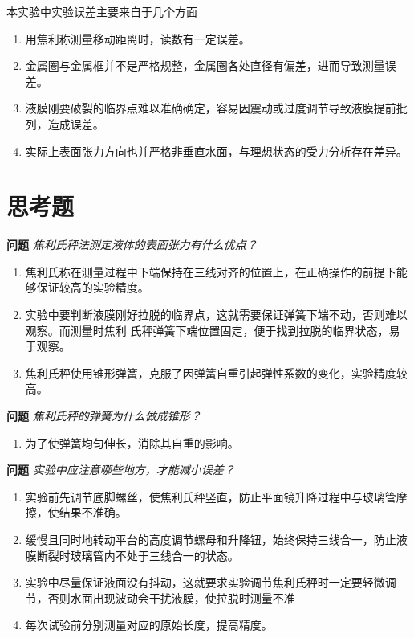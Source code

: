 \documentclass[10pt,a4paper]{article}	%
\begin{document}
	本实验中实验误差主要来自于几个方面

	\begin{enumerate}
		\item 用焦利称测量移动距离时，读数有一定误差。
		\item 金属圈与金属框并不是严格规整，金属圈各处直径有偏差，进而导致测量误差。
		\item 液膜刚要破裂的临界点难以准确确定，容易因震动或过度调节导致液膜提前批列，造成误差。
		\item 实际上表面张力方向也并严格非垂直水面，与理想状态的受力分析存在差异。
	\end{enumerate}

	\section{思考题}

	\noindent\textbf {问题 }\textsl{ 焦利氏秤法测定液体的表面张力有什么优点？}

	\begin{enumerate}
		\item 焦利氏称在测量过程中下端保持在三线对齐的位置上，在正确操作的前提下能够保证较高的实验精度。
		\item 实验中要判断液膜刚好拉脱的临界点，这就需要保证弹簧下端不动，否则难以观察。而测量时焦利
		氏秤弹簧下端位置固定，便于找到拉脱的临界状态，易于观察。
		\item 焦利氏秤使用锥形弹簧，克服了因弹簧自重引起弹性系数的变化，实验精度较高。
	\end{enumerate}

	\noindent\textbf {问题 }\textsl{ 焦利氏秤的弹簧为什么做成锥形？}

	\begin{enumerate}
		\item 为了使弹簧均匀伸长，消除其自重的影响。
	\end{enumerate}
	
	\noindent\textbf {问题 }\textsl{ 实验中应注意哪些地方，才能减小误差？}
	
	\begin{enumerate}
		\item 实验前先调节底脚螺丝，使焦利氏秤竖直，防止平面镜升降过程中与玻璃管摩擦，使结果不准确。
		\item 缓慢且同时地转动平台的高度调节螺母和升降钮，始终保持三线合一，防止液膜断裂时玻璃管内不处于三线合一的状态。
		\item 实验中尽量保证液面没有抖动，这就要求实验调节焦利氏秤时一定要轻微调节，否则水面出现波动会干扰液膜，使拉脱时测量不准
		\item 每次试验前分别测量对应的原始长度，提高精度。
	\end{enumerate}
\end{document}
